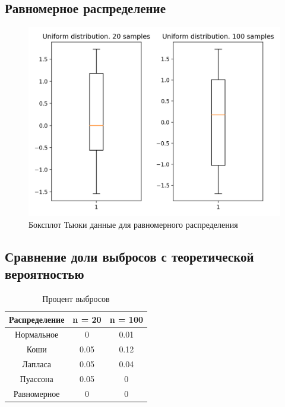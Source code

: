 \subsection{Равномерное распределение}
\begin{figure}[H]
	\begin{center}
		\includegraphics[scale=0.7]{fig/Uniform distribution.png}
		\caption{Боксплот Тьюки данные для равномерного распределения} 
		\label{pic:pic_name}
	\end{center}
\end{figure}



\subsection{Сравнение доли выбросов с теоретической вероятностью}
\begin{table}[H]
\caption{Процент выбросов}
\begin{center}
 \begin{tabular}{||c || c c ||} 
 \hline
 Распределение & n = 20  & n = 100 \\ 
 \hline\hline
  Нормальное  & 0 & 0.01 \\ 
 \hline
 Коши         & 0.05   & 0.12 \\
 \hline
  Лапласа     & 0.05  &  0.04  \\
 \hline
  Пуассона    & 0.05 &  0 \\
 \hline
  Равномерное & 0  &  0  \\
 \hline
\end{tabular}
\end{center}
\end{table}



